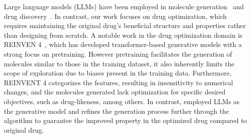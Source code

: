 Large language models (LLMs) have been employed in molecule generation~\citep{bagal2021molgpt, rothchild2021c5t5, frey2023neural} and drug discovery~\citep{bran2023transformers, liu2024erp}. In contrast, our work focuses on drug optimization, which requires maintaining the original drug's beneficial structure and properties rather than designing from scratch.
A notable work in the drug optimization domain is REINVEN 4~\citep{he2021molecular, he2022transformer, loeffler2024reinvent}, which has developed transformer-based generative models with a strong focus on pretraining. However pretraining facilitates the generation of molecules similar to those in the training dataset, it also inherently limits the scope of exploration due to biases present in the training data. {Furthermore, REINVENT 4 categorizes the features, resulting in insensitivity to numerical changes, and the molecules generated lack optimization for specific desired objectives, such as drug-likeness, among others.}
In contrast, {\fwname} employed LLMs as the generative model and refines the generation process further through the \algname algorithm to guarantee the improved property in the optimized drug compared to original drug.




